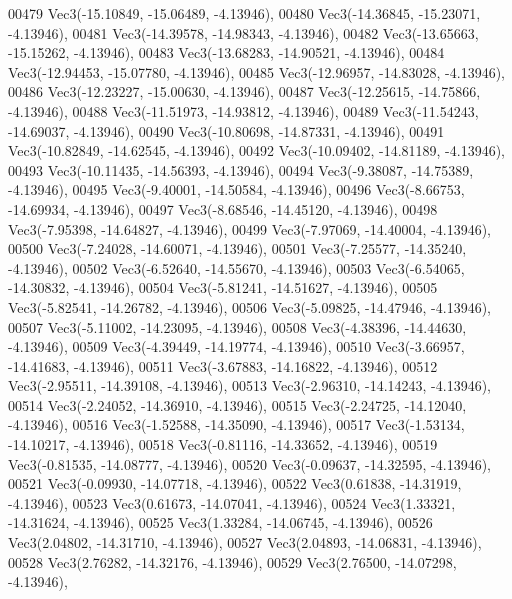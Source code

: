 \begin{DoxyCode}
00479         Vec3(-15.10849, -15.06489, -4.13946),
00480         Vec3(-14.36845, -15.23071, -4.13946),
00481         Vec3(-14.39578, -14.98343, -4.13946),
00482         Vec3(-13.65663, -15.15262, -4.13946),
00483         Vec3(-13.68283, -14.90521, -4.13946),
00484         Vec3(-12.94453, -15.07780, -4.13946),
00485         Vec3(-12.96957, -14.83028, -4.13946),
00486         Vec3(-12.23227, -15.00630, -4.13946),
00487         Vec3(-12.25615, -14.75866, -4.13946),
00488         Vec3(-11.51973, -14.93812, -4.13946),
00489         Vec3(-11.54243, -14.69037, -4.13946),
00490         Vec3(-10.80698, -14.87331, -4.13946),
00491         Vec3(-10.82849, -14.62545, -4.13946),
00492         Vec3(-10.09402, -14.81189, -4.13946),
00493         Vec3(-10.11435, -14.56393, -4.13946),
00494         Vec3(-9.38087, -14.75389, -4.13946),
00495         Vec3(-9.40001, -14.50584, -4.13946),
00496         Vec3(-8.66753, -14.69934, -4.13946),
00497         Vec3(-8.68546, -14.45120, -4.13946),
00498         Vec3(-7.95398, -14.64827, -4.13946),
00499         Vec3(-7.97069, -14.40004, -4.13946),
00500         Vec3(-7.24028, -14.60071, -4.13946),
00501         Vec3(-7.25577, -14.35240, -4.13946),
00502         Vec3(-6.52640, -14.55670, -4.13946),
00503         Vec3(-6.54065, -14.30832, -4.13946),
00504         Vec3(-5.81241, -14.51627, -4.13946),
00505         Vec3(-5.82541, -14.26782, -4.13946),
00506         Vec3(-5.09825, -14.47946, -4.13946),
00507         Vec3(-5.11002, -14.23095, -4.13946),
00508         Vec3(-4.38396, -14.44630, -4.13946),
00509         Vec3(-4.39449, -14.19774, -4.13946),
00510         Vec3(-3.66957, -14.41683, -4.13946),
00511         Vec3(-3.67883, -14.16822, -4.13946),
00512         Vec3(-2.95511, -14.39108, -4.13946),
00513         Vec3(-2.96310, -14.14243, -4.13946),
00514         Vec3(-2.24052, -14.36910, -4.13946),
00515         Vec3(-2.24725, -14.12040, -4.13946),
00516         Vec3(-1.52588, -14.35090, -4.13946),
00517         Vec3(-1.53134, -14.10217, -4.13946),
00518         Vec3(-0.81116, -14.33652, -4.13946),
00519         Vec3(-0.81535, -14.08777, -4.13946),
00520         Vec3(-0.09637, -14.32595, -4.13946),
00521         Vec3(-0.09930, -14.07718, -4.13946),
00522         Vec3(0.61838, -14.31919, -4.13946),
00523         Vec3(0.61673, -14.07041, -4.13946),
00524         Vec3(1.33321, -14.31624, -4.13946),
00525         Vec3(1.33284, -14.06745, -4.13946),
00526         Vec3(2.04802, -14.31710, -4.13946),
00527         Vec3(2.04893, -14.06831, -4.13946),
00528         Vec3(2.76282, -14.32176, -4.13946),
00529         Vec3(2.76500, -14.07298, -4.13946),

\end{DoxyCode}
